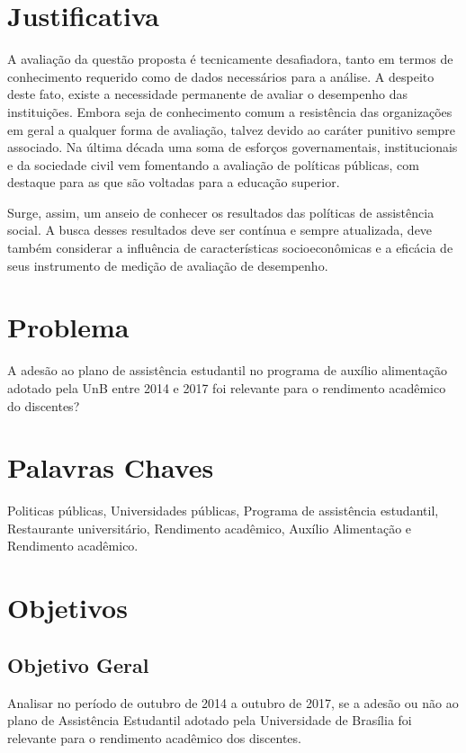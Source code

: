 \section{Justificativa}%

A avaliação da questão proposta é tecnicamente desafiadora, tanto em termos de conhecimento requerido como de dados necessários para a análise. A despeito deste fato, existe a necessidade permanente de avaliar o desempenho das instituições. Embora seja de conhecimento comum a resistência das organizações em geral a qualquer forma de avaliação, talvez devido ao caráter punitivo sempre associado. Na última década uma soma de esforços governamentais, institucionais e da sociedade civil vem fomentando a avaliação de  políticas públicas, com destaque para as que são voltadas para a educação superior.


Surge, assim, um anseio de conhecer os resultados das políticas de assistência social. A busca desses resultados deve ser contínua e sempre atualizada, deve também considerar a influência de características socioeconômicas e a eficácia de seus instrumento de medição de avaliação de desempenho.

\section{Problema}%
A adesão ao plano de assistência estudantil no programa de auxílio alimentação adotado pela UnB entre 2014 e 2017 foi relevante para o rendimento acadêmico do discentes?

\section{Palavras Chaves}%
Politicas públicas, Universidades públicas, Programa de assistência estudantil, Restaurante universitário, Rendimento acadêmico, Auxílio Alimentação e Rendimento acadêmico.


\section{Objetivos}%

\subsection{Objetivo Geral}
Analisar no período de outubro de 2014 a outubro de 2017, se a adesão ou não ao plano de Assistência Estudantil adotado pela Universidade de Brasília foi relevante para o rendimento acadêmico dos discentes.


